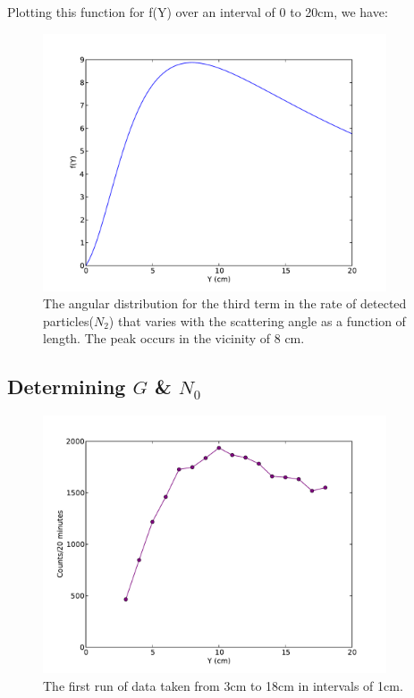 Plotting this function for f(Y) over an interval of 0 to 20cm, we have:
\begin{figure}[h!]
\begin{center}
\includegraphics[width=4in]{preliminary_plot.pdf}
\caption{The angular distribution for the third term in the rate of detected particles($N_2$) that varies with the scattering angle as a function of length. The peak occurs in the vicinity of 8 cm.}
\end{center}
\end{figure}

\subsection{Determining $G$ \& $N_0$}
\begin{figure}[h!]
\begin{center}
\includegraphics[width=4in]{firstrun.pdf}
\caption{The first run of data taken from 3cm to 18cm in intervals of 1cm.}
\end{center}
\end{figure}

